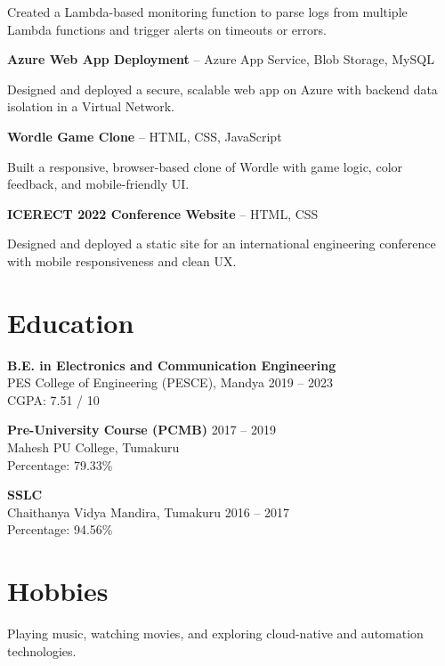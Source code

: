 \documentclass[a4paper,10pt]{article}
\begin{document}
Created a Lambda-based monitoring function to parse logs from multiple Lambda functions and trigger alerts on timeouts or errors.

\textbf{Azure Web App Deployment} – Azure App Service, Blob Storage, MySQL

Designed and deployed a secure, scalable web app on Azure with backend data isolation in a Virtual Network.

\textbf{Wordle Game Clone} – HTML, CSS, JavaScript

Built a responsive, browser-based clone of Wordle with game logic, color feedback, and mobile-friendly UI.

\textbf{ICERECT 2022 Conference Website} – HTML, CSS

Designed and deployed a static site for an international engineering conference with mobile responsiveness and clean UX.

\section*{Education}
\textbf{B.E. in Electronics and Communication Engineering} \\
PES College of Engineering (PESCE), Mandya \hfill 2019 – 2023 \\
CGPA: 7.51 / 10

\textbf{Pre-University Course (PCMB)} \hfill 2017 – 2019 \\
Mahesh PU College, Tumakuru \\
Percentage: 79.33\%

\textbf{SSLC} \\
Chaithanya Vidya Mandira, Tumakuru \hfill 2016 – 2017 \\
Percentage: 94.56\%

\section*{Hobbies}
Playing music, watching movies, and exploring cloud-native and automation technologies.
\end{document}
